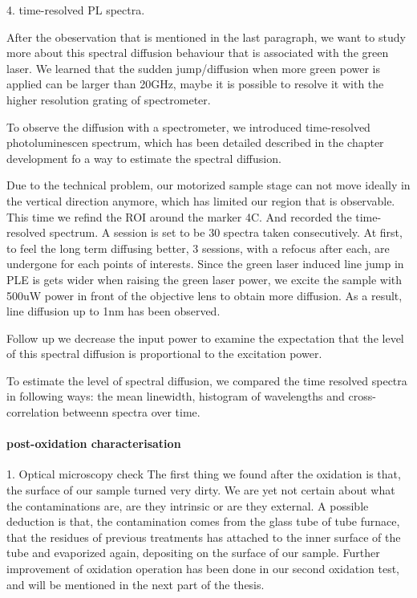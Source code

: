 4. time-resolved PL spectra.

After the obeservation that is mentioned in the last paragraph, we want to study more about this spectral diffusion behaviour that is associated with the green laser. We learned that the sudden jump/diffusion when more green power is applied can be larger than 20GHz, maybe it is possible to resolve it with the higher resolution grating of spectrometer. 

To observe the diffusion with a spectrometer, we introduced time-resolved photoluminescen spectrum, which has been detailed described in the chapter development fo a way to estimate the spectral diffusion.

Due to the technical problem, our motorized sample stage can not move ideally in the vertical direction anymore, which has limited our region that is observable. This time we refind the ROI around the marker 4C. And recorded the time-resolved spectrum. A session is set to be 30 spectra taken consecutively. At first, to feel the long term diffusing better, 3 sessions, with a refocus after each, are undergone for each points of interests. Since the green laser induced line jump in PLE is gets wider when raising the green laser power, we excite the sample with 500uW power in front of the objective lens to obtain more diffusion. As a result, line diffusion up to 1nm has been observed.

Follow up we decrease the input power to examine the expectation that the level of this spectral diffusion is proportional to the excitation power.

To estimate the level of spectral diffusion, we compared the time resolved spectra in following ways: the mean linewidth, histogram of wavelengths and cross-correlation betweenn spectra over time.



\paragraph{post-oxidation characterisation}
1. Optical microscopy check
The first thing we found after the oxidation is that, the surface of our sample turned very dirty. We are yet not certain about what the contaminations are, are they intrinsic or are they external. A possible deduction is that, the contamination comes from the glass tube of tube furnace, that the residues of previous treatments has attached to the inner surface of the tube and evaporized again, depositing on the surface of our sample. Further improvement of oxidation operation has been done in our second oxidation test, and will be mentioned in the next part of the thesis.


